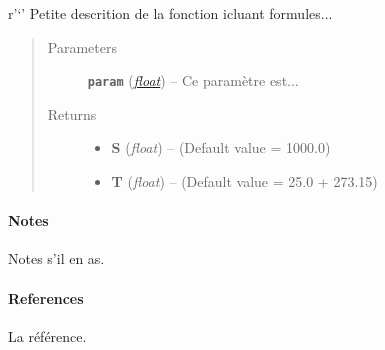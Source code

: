 \documentclass[letterpaper,10pt,english]{sphinxmanual}
\begin{document}
\begin{fulllineitems}
\label{python:solar_mod.I_pvR}
r'`' Petite descrition de la fonction icluant formules...
\begin{quote}\begin{description}
\item[{Parameters}] \leavevmode
\textbf{\texttt{param}} (\href{https://docs.python.org/library/functions.html\#float}{\emph{float}}) -- Ce paramètre est...

\item[{Returns}] \leavevmode
\begin{itemize}
\item {} 
\textbf{S} (\emph{float}) -- (Default value = 1000.0)

\item {} 
\textbf{T} (\emph{float}) -- (Default value = 25.0 + 273.15)

\end{itemize}


\end{description}\end{quote}
\paragraph{Notes}

Notes s'il en as.
\paragraph{References}

La référence.

\end{fulllineitems}

\end{document}
